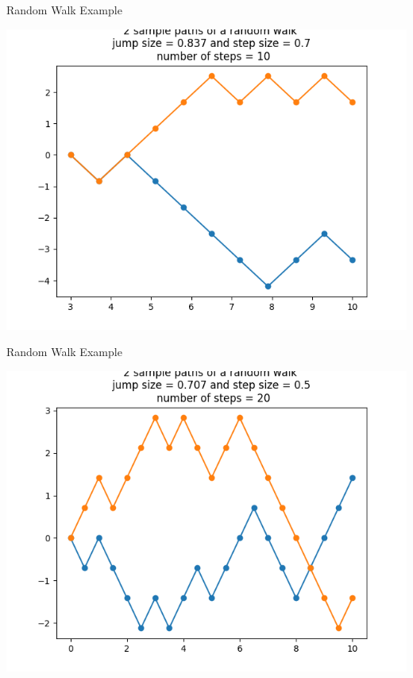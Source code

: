 \documentclass{beamer}%
\numberwithin{equation}{section}
\begin{document}
\begin{frame}{Random Walk Example}
	\begin{center}
		\includegraphics[scale=.6]{randomwalk10steps.png}
	\end{center}
\end{frame}

\begin{frame}{Random Walk Example}
	\begin{center}
		\includegraphics[scale=.6]{randomwalk20steps.png}
	\end{center}
\end{frame}
\end{document}
